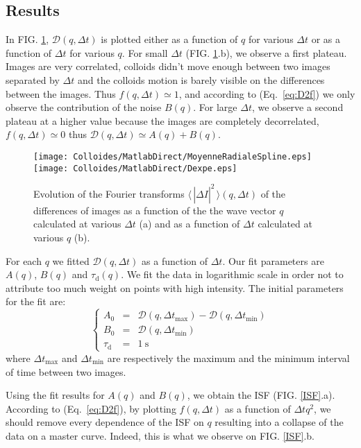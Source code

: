 \documentclass[%
 aip,
 jmp,%
 amsmath,amssymb,
reprint,%
]{revtex4-1}
\begin{document}
\subsection{Results}

In FIG. \ref{D}, $\mathcal{D}(q, \Delta t)$ is plotted either as a function of $q$ for various $\Delta t$ or as a function of $\Delta t$ for various $q$. For small $\Delta t$ (FIG. \ref{D}.b), we observe a first plateau. Images are very correlated, colloids didn't move enough between two images separated by $\Delta t$ and the colloids motion is barely visible on the differences between the images. Thus $f(q, \Delta t) \simeq 1$, and according to (Eq.~\ref{eq:D2f}) we only observe the contribution of the noise $B(q)$. For large $\Delta t$, we observe a second plateau at a higher value because the images are completely decorrelated, $f(q, \Delta t) \simeq 0$ thus $\mathcal{D}(q, \Delta t) \simeq A(q)+B(q)$.

\begin{figure}
	\texttt{[image: Colloides/MatlabDirect/MoyenneRadialeSpline.eps]}\\
	\texttt{[image: Colloides/MatlabDirect/Dexpe.eps]}
	\caption{Evolution of the Fourier transforms $\langle \, |\widehat{\Delta I}|^2 \, \rangle (q, \Delta t)$ of the differences of images as a function of the the wave vector $q$ calculated at various $\Delta t$ (a) and as a function of $\Delta t$ calculated at various $q$ (b).}
	\label{D}
\end{figure}

For each $q$ we fitted $\mathcal{D}(q, \Delta t)$ as a function of $\Delta t$. Our fit parameters are $A(q)$, $B(q)$ and $\tau_\text{d}(q)$. We fit the data in logarithmic scale in order not to attribute too much weight on points with high intensity. The initial parameters for the fit are:
\begin{equation}
\left\{
\begin{array}{rcl}
A_0 &=& \mathcal{D} (q,\Delta t_\text{max}) - \mathcal{D} (q,\Delta t_\text{min}) \\
B_0 &=& \mathcal{D} (q,\Delta t_\text{min}) \\
\tau_\text{d} &=& \SI{1}{\second}
\end{array}
\right.
\end{equation}
where $\Delta t_\text{max}$ and $\Delta t_\text{min}$ are respectively the maximum and the minimum interval of time between two images.

Using the fit results for $A(q)$ and $B(q)$, we obtain the ISF (FIG. \ref{ISF}.a). According to (Eq.~\ref{eq:D2f}), by plotting $f(q, \Delta t)$ as a function of $\Delta t q^2$, we should remove every dependence of the ISF on $q$ resulting into a collapse of the data on a master curve. Indeed, this is what we observe on FIG. \ref{ISF}.b. 
\end{document}
